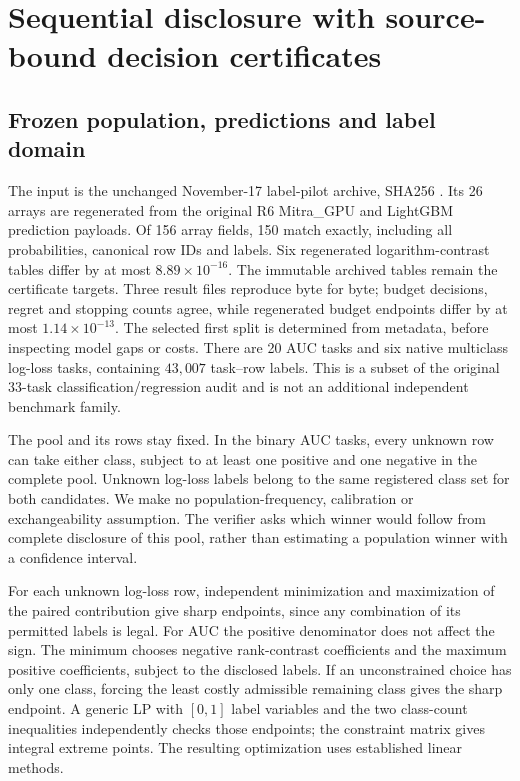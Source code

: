 \FloatBarrier
\section{Sequential disclosure with source-bound decision certificates}\label{sec:supdisclosure}
\FloatBarrier
\subsection{Frozen population, predictions and label domain}
The input is the unchanged November-17 label-pilot archive, SHA256 \texttt{}. Its 26 arrays are regenerated from the original R6 Mitra\_GPU and LightGBM prediction payloads. Of 156 array fields, 150 match exactly, including all probabilities, canonical row IDs and labels. Six regenerated logarithm-contrast tables differ by at most $8.89\times10^{-16}$. The immutable archived tables remain the certificate targets. Three result files reproduce byte for byte; budget decisions, regret and stopping counts agree, while regenerated budget endpoints differ by at most $1.14\times10^{-13}$. The selected first split is determined from metadata, before inspecting model gaps or costs. There are 20 AUC tasks and six native multiclass log-loss tasks, containing $43{,}007$ task--row labels. This is a subset of the original 33-task classification/regression audit and is not an additional independent benchmark family.

The pool and its rows stay fixed. In the binary AUC tasks, every unknown row can take either class, subject to at least one positive and one negative in the complete pool. Unknown log-loss labels belong to the same registered class set for both candidates. We make no population-frequency, calibration or exchangeability assumption. The verifier asks which winner would follow from complete disclosure of this pool, rather than estimating a population winner with a confidence interval.

For each unknown log-loss row, independent minimization and maximization of the paired contribution give sharp endpoints, since any combination of its permitted labels is legal. For AUC the positive denominator does not affect the sign. The minimum chooses negative rank-contrast coefficients and the maximum positive coefficients, subject to the disclosed labels. If an unconstrained choice has only one class, forcing the least costly admissible remaining class gives the sharp endpoint. A generic LP with $[0,1]$ label variables and the two class-count inequalities independently checks those endpoints; the constraint matrix gives integral extreme points. The resulting optimization uses established linear methods.

